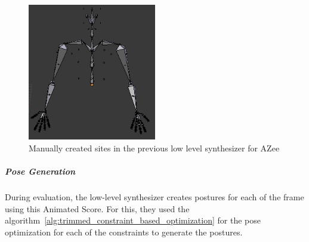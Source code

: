 \documentclass[../../main.tex]{subfiles}
\begin{document}
\begin{figure}
    \centering
    \includegraphics[width=0.5\textwidth]{chapters/background_work/images/prev_sites.png}
    \caption{Manually created sites in the previous low level synthesizer for AZee}
    \label{fig:prev_sites}
\end{figure}

\subparagraph{Pose Generation}
\label{ch:background_work:sign_language_synthesis:3d_techniques:sign_language_synthesis_systems:azee_based:low_level_synthesizer_for_azee:pose_generation}

During evaluation, the low-level synthesizer creates postures for each of the frame using this Animated Score. For this, they used the algorithm~\ref{alg:trimmed_constraint_based_optimization} for the pose optimization for each of the constraints to generate the postures. 
\end{document}
